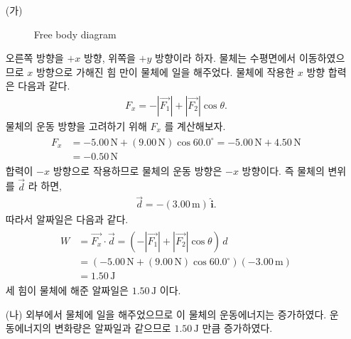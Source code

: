 \documentclass[floatfix,nofootinbib,superscriptaddress,fleqn]{revtex4-2}
\begin{document}
\begin{itemize}
  \item [(가)] 
  \begin{figure}
     \caption{Free body diagram}
  \end{figure}
 오른쪽 방향을 $+x$ 방향, 위쪽을 $+y$ 방향이라 하자. 
 물체는 수평면에서 이동하였으므로 $x$ 방향으로 가해진 힘 만이 물체에 일을 해주었다. 
 물체에 작용한 $x$ 방향 합력은 다음과 같다.
 \begin{align}
   F_x = -|\vec{F_1}|+|\vec{F_2}|\cos{\theta}.
 \end{align}
 물체의 운동 방향을 고려하기 위해 $F_x$ 를 계산해보자.
 \begin{align}
  \begin{split}
    F_x &= -5.00\,\mathrm{N}+(9.00\,\mathrm{N})\cos{60.0^\circ}
    = -5.00\,\mathrm{N}+4.50\,\mathrm{N} \\
    &= -0.50\,\mathrm{N}
  \end{split}
 \end{align}
 합력이 $-x$ 방향으로 작용하므로 물체의 운동 방향은 $-x$ 방향이다. 즉 
 물체의 변위를 $\vec{d}$ 라 하면,
 \begin{align}\label{eq:3-1}
   \vec{d} = -(3.00\,\mathrm{m})\,\hat{\bm{i}}.
 \end{align} 
 따라서 알짜일은 다음과 같다.
 \begin{align}
  \begin{split}
    W &= \vec{F_x}\cdot\vec{d}= \left(-|\vec{F_1}|+|\vec{F_2}|\cos{\theta}\right)\,d \\
    &= \left(-5.00\,\mathrm{N}+(9.00\,\mathrm{N})\cos{60.0^\circ}\right)
    (-3.00\,\mathrm{m})  \\
    &= 1.50\,\mathrm{J}
  \end{split}
 \end{align}
 세 힘이 물체에 해준 알짜일은 $1.50\,\mathrm{J}$ 이다.
  \item [(나)] 외부에서 물체에 일을 해주었으므로 이 물체의 운동에너지는 
  증가하였다. 운동에너지의 변화량은 알짜일과 같으므로 $1.50\,\mathrm{J}$ 
  만큼 증가하였다.
\end{itemize}
\end{document}
